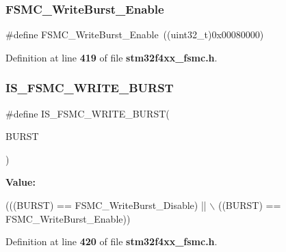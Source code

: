 \subsubsection{F\+S\+M\+C\+\_\+\+Write\+Burst\+\_\+\+Enable}
{\footnotesize\ttfamily \#define F\+S\+M\+C\+\_\+\+Write\+Burst\+\_\+\+Enable~((uint32\+\_\+t)0x00080000)}



Definition at line \textbf{ 419} of file \textbf{ stm32f4xx\+\_\+fsmc.\+h}.

\mbox{\label{group__FSMC__Write__Burst_gab7b03a33fab765827832abbf07d01a10}} 
\subsubsection{I\+S\+\_\+\+F\+S\+M\+C\+\_\+\+W\+R\+I\+T\+E\+\_\+\+B\+U\+R\+ST}
{\footnotesize\ttfamily \#define I\+S\+\_\+\+F\+S\+M\+C\+\_\+\+W\+R\+I\+T\+E\+\_\+\+B\+U\+R\+ST(\begin{DoxyParamCaption}\item[{}]{B\+U\+R\+ST }\end{DoxyParamCaption})}

{\bfseries Value\+:}
\begin{DoxyCode}
(((BURST) == FSMC_WriteBurst_Disable) || \(\backslash\)
                                    ((BURST) == FSMC_WriteBurst_Enable))
\end{DoxyCode}


Definition at line \textbf{ 420} of file \textbf{ stm32f4xx\+\_\+fsmc.\+h}.

